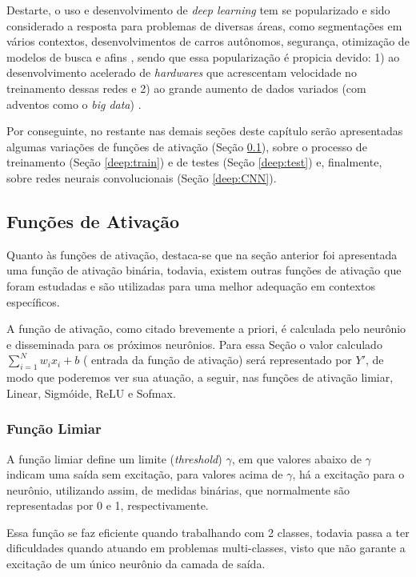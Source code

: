 Destarte, o uso e desenvolvimento de \textit{deep learning} tem se popularizado e sido considerado a resposta para problemas de diversas áreas, como segmentações em vários contextos, desenvolvimentos de carros autônomos, segurança, otimização de modelos de busca e afins \cite{Ghosh2019}, sendo que essa popularização é propicia devido: 1) ao desenvolvimento acelerado de \textit{hardwares} que acrescentam velocidade no treinamento dessas redes e 2) ao grande aumento de dados variados (com adventos como o \textit{big data}) \cite{Szegedy2015, ponti2018funciona}.

Por conseguinte, no restante nas demais seções  deste capítulo serão apresentadas algumas variações de funções de ativação (Seção \ref{deep:activation}), sobre o processo de treinamento (Seção \ref{deep:train}) e de testes (Seção \ref{deep:test}) e, finalmente, sobre redes neurais convolucionais (Seção \ref{deep:CNN}).


\subsection{Funções de Ativação}
\label{deep:activation}

Quanto às funções de ativação, destaca-se que na seção anterior foi apresentada uma função de ativação binária, todavia, existem outras funções de ativação que foram estudadas e são utilizadas para uma melhor adequação em contextos específicos.

A função de ativação, como citado brevemente a priori, é calculada pelo neurônio e disseminada para os próximos neurônios.  Para essa Seção o valor calculado $\sum_{i = 1}^{N} w_ix_i +b$ ( entrada da função de ativação) será representado por $Y'$, de modo que poderemos ver sua atuação, a seguir, nas funções de ativação limiar, Linear, Sigmóide, ReLU e Sofmax.


\subsubsection{Função Limiar}
A função limiar define um limite (\textit{threshold}) $\gamma$, em que valores abaixo de $\gamma$ indicam uma saída sem excitação, para valores acima de $\gamma$, há a excitação para o neurônio, utilizando assim, de medidas binárias, que normalmente são representadas por 0 e 1, respectivamente.

Essa função se faz eficiente quando trabalhando com 2 classes, todavia passa a ter dificuldades quando atuando em problemas multi-classes, visto que não garante a excitação de um único neurônio da camada de saída.

